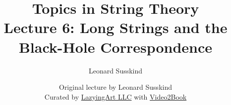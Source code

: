 \documentclass[11pt,oneside]{book}
\begin{document}
\frontmatter
\title{Topics in String Theory\\[0.45em]\large Lecture 6: Long Strings and the Black-Hole Correspondence}
\author{Leonard Susskind}
\date{Original lecture by Leonard Susskind\\[0.35em]Curated by \href{https://lazying.art}{LazyingArt LLC} with \href{https://github.com/lachlanchen/Video2Book}{Video2Book}}
\maketitle
\mainmatter

\end{document}
